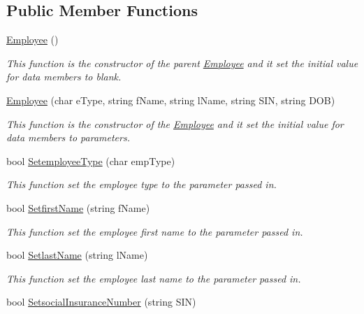 \subsection*{Public Member Functions}
\begin{DoxyCompactItemize}
\item 
\hyperlink{class_all_employees_1_1_employee_ac3aa5a59bf1ddba2c45cc933bf897e04}{Employee} ()
\begin{DoxyCompactList}\small\item\em This function is the constructor of the parent \hyperlink{class_all_employees_1_1_employee}{Employee} and it set the initial value for data members to blank. \end{DoxyCompactList}\item 
\hyperlink{class_all_employees_1_1_employee_a9f0bb5b4032b00dec2f0ee75dd085675}{Employee} (char e\-Type, string f\-Name, string l\-Name, string S\-I\-N, string D\-O\-B)
\begin{DoxyCompactList}\small\item\em This function is the constructor of the \hyperlink{class_all_employees_1_1_employee}{Employee} and it set the initial value for data members to parameters. \end{DoxyCompactList}\item 
bool \hyperlink{class_all_employees_1_1_employee_a59319c6958d61012d7f719637d70e09c}{Setemployee\-Type} (char emp\-Type)
\begin{DoxyCompactList}\small\item\em This function set the employee type to the parameter passed in. \end{DoxyCompactList}\item 
bool \hyperlink{class_all_employees_1_1_employee_a135061e5816243361f816b081facc605}{Setfirst\-Name} (string f\-Name)
\begin{DoxyCompactList}\small\item\em This function set the employee first name to the parameter passed in. \end{DoxyCompactList}\item 
bool \hyperlink{class_all_employees_1_1_employee_a871113f39d4ea6f72b59035520dfed17}{Setlast\-Name} (string l\-Name)
\begin{DoxyCompactList}\small\item\em This function set the employee last name to the parameter passed in. \end{DoxyCompactList}\item 
bool \hyperlink{class_all_employees_1_1_employee_a9ad6d40aa4d08912f040bfdb984bc992}{Setsocial\-Insurance\-Number} (string S\-I\-N)

\end{DoxyCompactItemize}
